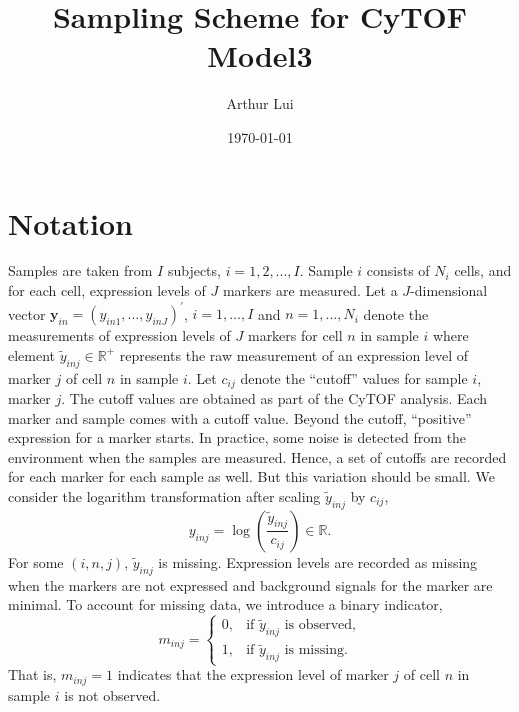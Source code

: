 \documentclass[12pt]{article}
\title{Sampling Scheme for CyTOF Model3}
\author{Arthur Lui}
\date{\today}
\newcommand{\p}[1]{\left(#1\right)}
\def\y{\bm{y}}
\begin{document}
\onehalfspacing

\maketitle

\section{Notation}\label{notation}

Samples are taken from $I$ subjects, $i = 1,2,...,I$. Sample $i$ consists of
$N_i$ cells, and for each cell, expression levels of $J$ markers are measured.
Let a $J$-dimensional vector $\y_{in}=(y_{in1}, \ldots, y_{inJ})^\prime$, $i=1,
\ldots, I$ and $n=1, \ldots, N_i$ denote the measurements of expression levels
of $J$ markers for cell $n$ in sample $i$ where element $\tilde{y}_{inj} \in
\mathbb{R}^+$ represents the raw measurement of an expression level of marker
$j$ of cell $n$ in sample $i$. Let $c_{ij}$ denote the ``cutoff'' values
for sample $i$, marker $j$.
The cutoff values are obtained as part of the CyTOF analysis. Each marker and
sample comes with a cutoff value. Beyond the cutoff, ``positive'' expression
for a marker starts. In practice, some noise is detected from the environment
when the samples are measured. Hence, a set of cutoffs are recorded for each
marker for each sample as well. But this variation should be small.
%
We consider the logarithm transformation after
scaling $\tilde{y}_{inj}$ by $c_{ij}$, $$
y_{inj}=\log\p{\frac{\tilde{y}_{inj}}{c_{ij}}} \in \mathbb{R}.  $$ For some
$(i, n, j)$, $\tilde{y}_{inj}$ is missing.
Expression levels are recorded as missing when the markers are not expressed
and background signals for the marker are minimal. 
%
To account for missing data, we introduce a binary indicator, $$
m_{inj} = \begin{cases}
  0, & \text{if $\tilde{y}_{inj}$ is observed,} \\
  1, & \text{if $\tilde{y}_{inj}$ is missing.}
\end{cases}
$$ That is, $m_{inj}=1$ indicates that the expression level of marker
$j$ of cell $n$ in sample $i$ is not observed. 
\end{document}
